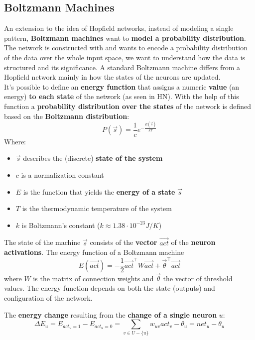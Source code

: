 \documentclass[11pt]{article}
\begin{document}
		
		\newpage
		
		\subsection{Boltzmann Machines}
		An extension to the idea of Hopfield networks, instead of modeling a single pattern, \textbf{Boltzmann machines} want to \textbf{model a probability distribution}. The network is constructed with and wants to encode a probability distribution of the data over the whole input space, we want to understand how the data is structured and its significance. A standard Boltzmann machine differs from a Hopfield network mainly in how the states of the neurons are updated. \\
		
		It's possible to define an \textbf{energy function} that assigns a numeric \textbf{value} (an energy) \textbf{to each state} of the network (as seen in HN). With the help of this function a \textbf{probability distribution over the states} of the network is defined based on the \textbf{Boltzmann distribution}:
		$$ P(\vec{s}) = \frac{1}{c} e^{-\frac{E(\vec{s})}{kT}} $$
		Where: 
		\begin{itemize}
			\item $\vec{s}$ describes the (discrete) \textbf{state of the system}
			\item $c$ is a normalization constant
			\item $E$ is the function that yields the \textbf{energy of a state} $\vec{s}$
			\item $T$ is the thermodynamic temperature of the system 
			\item $k$ is Boltzmann's constant ($k \approx 1.38 \cdot 10^{-23} J/K$)
		\end{itemize}
		
		The state of the machine $\vec{s}$ consists of the \textbf{vector} $\vec{act}$ of the \textbf{neuron activations}. The energy function of a Boltzmann machine 
		$$ E(\vec{act}) = - \frac{1}{2} \vec{act}^\top W \vec{act} + \vec{\theta}^\top \vec{act} $$
		where $W$ is the matrix of connection weights and $\vec{\theta}$ the vector of threshold values. The energy function depends on both the state (outputs) and configuration of the network.\\
		
		\newpage
		
		The \textbf{energy change} resulting from the \textbf{change of a single neuron} $u$:
		$$ \Delta E_u = E_{act_u = 1} - E_{act_u = 0} = \sum_{v \in U - \{u\}} w_{uv} act_v - \theta_u = net_u - \theta_u $$
		
\end{document}

